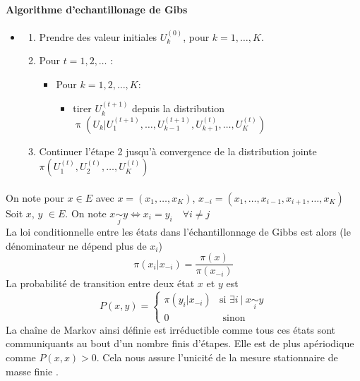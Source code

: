 \documentclass{article}
\theoremstyle{definition}
\theoremstyle{remark}
\begin{document}
{\paragraph{Algorithme d'echantillonage de Gibs \\}
\begin{itemize}[label={}]
\item \begin{enumerate}
	\item Prendre des valeur initiales $U^{(0)}_k$, pour $k = 1, \ldots, K$.
	\item Pour $t = 1, 2, \ldots$ :
	\begin{itemize}[label={}]
		\item Pour $k = 1,2, \ldots, K$:
		\begin{itemize}[label={}]
			\item tirer $U_k^{(t+1)}$ depuis la distribution 
			$\operatorname{\pi}(U_{k} | U_{1}^{(t+1)}, \ldots, U_{k-1}^{(t+1)}, U_{k+1}^{(t)}, \ldots, U_{K}^{(t)})$ 
		\end{itemize}
	\end{itemize}
	\item Continuer l'étape 2 jusqu'à convergence de la distribution jointe
	$\pi (U_{1}^{(t)}, U_{2}^{(t)}, \ldots, U_{K}^{(t)})$	
\end{enumerate}
\end{itemize}
\paragraph{}

\paragraph{}
On note pour $x \in E$ avec $x=(x_1,\ldots,x_K)$, $x_{-i} = (x_1, \ldots,x_{i-1},x_{i+1}, \ldots, x_K)$ \\
Soit $x$, $y$ $\in E$. On note $x \underset{j}{\sim} y  \Longleftrightarrow x_{i}=y_{i} \quad \forall i \neq j$ \\
La loi conditionnelle entre les états dans l'échantillonnage de Gibbs est alors (le dénominateur ne dépend plus de $x_i$)
$$
\pi(x_{i} | x_{-i})= \frac{\pi(x)}{\pi(x_{-i})}
$$
La probabilité de transition entre deux état $x$ et $y$ est 
$$
P(x,y)=\left\{\begin{array}{ll}
{\pi(y_{i} | x_{-i})} & {\text{si } \exists i\ |\ x \underset{i}{\sim} y }\\
 {0} & {\text { sinon }}
\end{array}\right.
$$
La chaîne de Markov ainsi définie est irréductible comme tous ces états sont communiquants au bout d'un nombre finis d'étapes.
 Elle est de plus apériodique comme $P(x,x)>0$. Cela nous assure l'unicité de la mesure stationnaire de masse finie \cite{wiki}.
}
\end{document}
